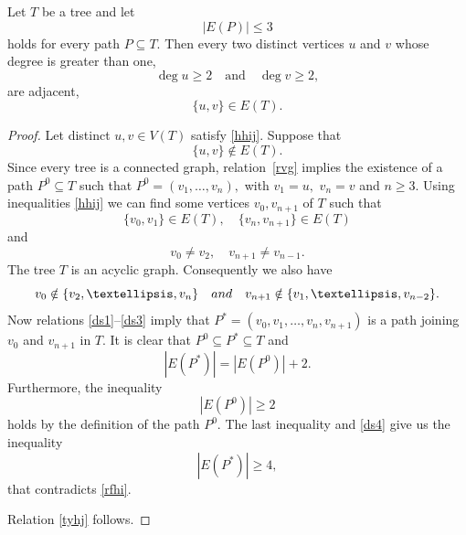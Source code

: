 \documentclass[10pt,a4paper]{amsart}
\begin{document}
\begin{lemma}\label{wsdt}
Let \( T \) be a tree and let 
\begin{equation}
    \label{rfhi}
    |E(P)| \leq 3
\end{equation}
holds for every path $P\subseteq T$.  
Then 
every two distinct vertices \( u\) and \( v \) whose degree is greater than one, 
\begin{equation}
    \label{hhij}
\operatorname{deg} u \geq 2 \quad \text{and} \quad \operatorname{deg} v \geq 2,
\end{equation}
are adjacent,  
\begin{equation}
    \label{tyhj}
\{u,v\} \in E(T). 
\end{equation}
\end{lemma}

\begin{proof}
Let distinct $u,v\in V(T)$ satisfy \eqref{hhij}.
Suppose that
\begin{equation}
    \label{rvg}
    \{u,v\} \notin E(T). 
\end{equation}
Since every tree is a connected graph, relation~\eqref{rvg} implies the existence of a path \( P^0 \subseteq T \) such that
$
P^0= (v_1, \ldots, v_n),
$
with \( v_1 =u,\) \( v_n = v \) and \( n \geq 3 \).
Using inequalities \eqref{hhij} we can find some vertices $v_0, v_{n+1}$ of $T$ such that
\begin{equation}
    \label{ds1}
\{v_0, v_1\} \in E(T), \quad 
\{v_{n}, v_{n+1}\} \in E(T)
\end{equation}
and 
\begin{equation}
     \label{ds2}
     v_0 \neq v_2, \quad v_{n+1} \neq v_{n-1}.
\end{equation}
The tree $T$ is an acyclic graph. Consequently we also have
\begin{equation}     \label{ds3}
v_0 \notin \{v_2, \ldots, v_n\}
\quad {\rm and} \quad
     v_{n+1} \notin \{v_1, \ldots, v_{n-2}\}.
\end{equation}
Now relations \eqref{ds1}--\eqref{ds3} imply that
$
P^* = (v_0, v_1, \ldots, v_n, v_{n+1})
$
is a path joining $v_0$ and $v_{n+1}$ in $T$.
It is clear that $P^0\subseteq P^*\subseteq T$ and
\begin{equation}
    \label{ds4}
|E(P^*)| = |E(P^0)| + 2. 
\end{equation}
Furthermore, the inequality
\begin{equation*}
    |E(P^0)| \geq 2
\end{equation*}
holds by the definition of the path $P^0$. The last inequality and \eqref{ds4} give us the inequality
\[
|E(P^*)| \geq 4,
\]
that contradicts \eqref{rfhi}. 

Relation \eqref{tyhj} follows. 

\end{proof}
\end{document}
